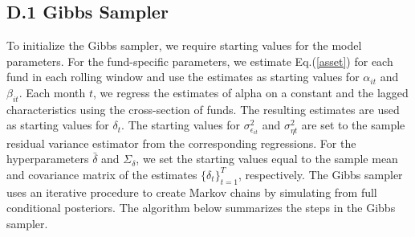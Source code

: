 \subsection*{D.1 \hspace{0.1cm} Gibbs Sampler}
To initialize the Gibbs sampler, we require starting values for the model parameters. For the fund-specific parameters, we estimate Eq.(\ref{asset}) for each fund in each rolling window and use the estimates as starting values for $\alpha_{it}$ and $\beta_{it}$. Each month $t$, we regress the estimates of alpha on a constant and the lagged characteristics using the cross-section of funds. The resulting estimates are used as starting values for $\delta_t$. The starting values for $\sigma^2_{\epsilon_{it}}$ and $\sigma^2_{\eta t}$ are set to the sample residual variance estimator from the corresponding regressions. For the hyperparameters $\bar{\delta}$ and $\Sigma_\delta$, we set the starting values equal to the sample mean and covariance matrix of the estimates $\{\delta_t\}^T_{t=1}$, respectively. The Gibbs sampler uses an iterative procedure to create Markov chains by simulating from full conditional posteriors. The algorithm below summarizes the steps in the Gibbs sampler.

